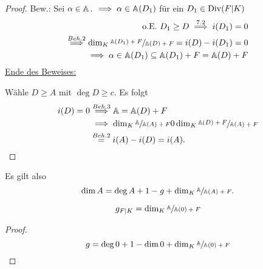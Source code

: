 \begin{proof}
    Bew.: Sei $\alpha \in \mathbb{A}$. $\implies \alpha \in \mathbb{A}(D_1)$ für ein $D_1 \in \operatorname{Div}(F|K)$
    \begin{align*}
        \text{o.E. } D_1 \geq D \stackrel{7.2}{\implies} i(D_1) = 0\\
        \stackrel{Beh. 2}{\implies} \dim_K \sfrac{\mathbb{A}(D_1)+F}{\mathbb{A}(D) + F} = i(D)- i(D_1) = 0\\
        \implies \alpha \in \mathbb{A}(D_1) \subseteq \mathbb{A}(D_1)+F = \mathbb{A}(D) +F
    \end{align*}
    \underline{Ende des Beweises:}
    
    Wähle $D \geq A$ mit $\deg D \geq c$. Es folgt
    \begin{align*}
        i(D) = 0 &\stackrel{Beh. 3}{\implies} \mathbb{A} = \mathbb{A}(D) + F\\
        & \implies \dim_K \sfrac{\mathbb{A}}{\mathbb{A}(A)+F} 0 \dim_K \sfrac{\mathbb{A}(D)+F}{\mathbb{A}(A)+F} \\
        & \stackrel{Beh. 2}{=} i(A) - i(D) = i(A).
    \end{align*}
\end{proof}

\begin{bemerkungnr}
    Es gilt also
    $$ \dim A = \deg A + 1 - g + \dim_K \sfrac{\mathbb{A}}{\mathbb{A}(A) + F}.$$
\end{bemerkungnr}

\begin{korollar}
    $$ g_{F|K} = \dim_K \sfrac{\mathbb{A}}{\mathbb{A}(0) + F}$$
\end{korollar}
\begin{proof}
    $$ g = \deg 0 + 1 - \dim 0 + \dim_K \sfrac{\mathbb{A}}{\mathbb{A}(0) + F}$$
\end{proof}

